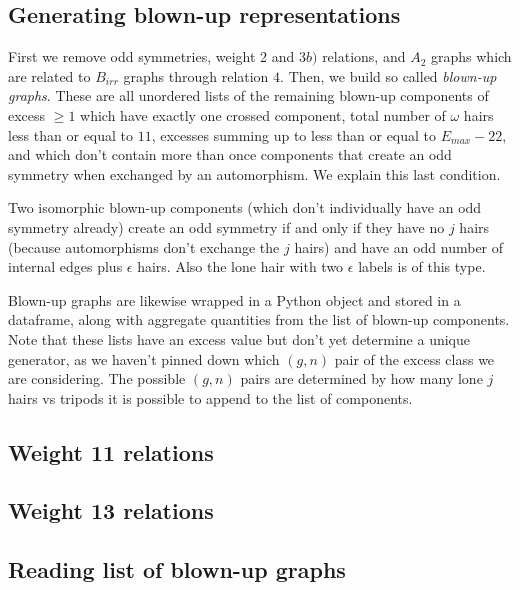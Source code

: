 \subsection{Generating blown-up representations}  First we remove odd symmetries, weight 2 and $3b)$ relations, and $A_2$ graphs which are related to $B_{irr}$ graphs through relation $4$. Then, we build so called \textit{blown-up graphs}. These are all unordered lists of the remaining blown-up components of excess $\geq 1$ which have exactly one crossed component, total number of $\omega$ hairs less than or equal to $11$, excesses summing up to less than or equal to $E_{max}-22$, and which don't contain more than once components that create an odd symmetry when exchanged by an automorphism. We explain this last condition.

Two isomorphic blown-up components (which don't individually have an odd symmetry already) create an odd symmetry if and only if they have no $j$ hairs (because automorphisms don't exchange the $j$ hairs) and have an odd number of internal edges plus $\epsilon$ hairs. Also the lone hair with two $\epsilon$ labels is of this type.

Blown-up graphs are likewise wrapped in a Python object and stored in a dataframe, along with aggregate quantities from the list of blown-up components. Note that these lists have an excess value but don't yet determine a unique generator, as we haven't pinned down which $(g,n)$ pair of the excess class we are considering. The possible $(g,n)$ pairs are determined by how many lone $j$ hairs vs tripods it is possible to append to the list of components.



\subsection{Weight 11 relations}


\subsection{Weight 13 relations}



\subsection{Reading list of blown-up graphs}